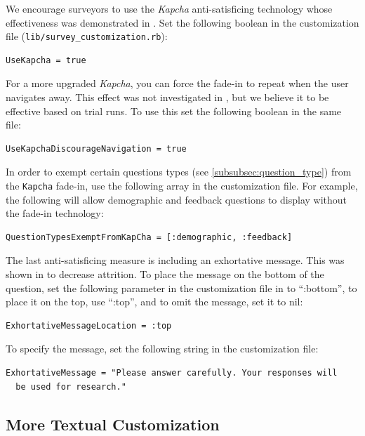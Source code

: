 \documentclass[12pt]{article}
\begin{document}
We encourage surveyors to use the \textit{Kapcha} anti-satisficing technology whose effectiveness was demonstrated in \citet{KapelnerChandler2010}. Set the following boolean in the customization file ({\tt{lib/survey\_customization.rb}}): 

\begin{verbatim}
UseKapcha = true
\end{verbatim}

For a more upgraded \textit{Kapcha}, you can force the fade-in to repeat when the user navigates away. This effect was not investigated in \citet{KapelnerChandler2010}, but we believe it to be effective based on trial runs. To use this set the following boolean in the same file:

\begin{verbatim}
UseKapchaDiscourageNavigation = true
\end{verbatim}

In order to exempt certain questions types (see \ref{subsubsec:question_type}) from the \texttt{Kapcha} fade-in, use the following array in the customization file. For example, the following will allow demographic and feedback questions to display without the fade-in technology:

\begin{verbatim}
QuestionTypesExemptFromKapCha = [:demographic, :feedback]
\end{verbatim}

The last anti-satisficing measure is including an exhortative message. This was shown in \citet{KapelnerChandler2010} to decrease attrition. To place the message on the bottom of the question, set the following parameter in the customization file in to ``:bottom'', to place it on the top, use ``:top'', and to omit the message, set it to nil:

\begin{verbatim}
ExhortativeMessageLocation = :top
\end{verbatim}
  
To specify the message, set the following string in the customization file:

\begin{verbatim}
ExhortativeMessage = "Please answer carefully. Your responses will
  be used for research."
\end{verbatim}  

\subsection{More Textual Customization}
\end{document}
